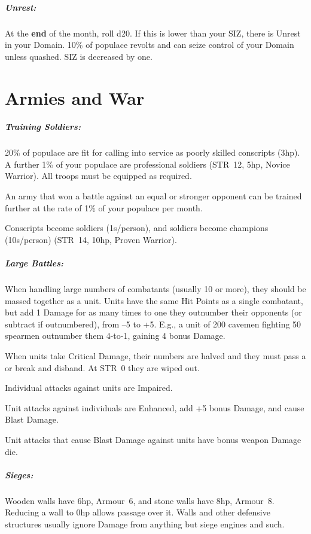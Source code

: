 \documentclass[itdr]{subfiles}
\begin{document}
\subparagraph{Unrest:} At the \textbf{end} of the month, roll d20. If this is lower than your SIZ, there is Unrest in your Domain. 10\% of populace revolts and can seize control of your Domain unless quashed. SIZ is decreased by one.

\section{Armies and War}


\subparagraph{Training Soldiers:} 20\% of populace are fit for calling into service as poorly skilled conscripts (3hp). A further 1\% of your populace are professional soldiers (STR~12, 5hp, Novice Warrior). All troops must be equipped as required.

An army that won a battle against an equal or stronger opponent can be trained further at the rate of 1\% of your populace per month.

Conscripts become soldiers (1s/person), and \mbox{soldiers} become champions (10s/person) (STR~14, 10hp, Proven Warrior).

\subparagraph{Large Battles:} When handling large numbers of combatants (usually 10 or more), they should be massed together as a unit. Units have the same Hit Points as a single combatant, but add 1 Damage for as many times to one they outnumber their opponents (or subtract if outnumbered), from --5 to +5. E.g., a unit of 200 cavemen fighting 50 spearmen outnumber them \mbox{4-to-1}, gaining 4 bonus Damage.

When units take Critical Damage, their numbers are halved and they must pass a  or break and disband. At STR~0 they are wiped out.

Individual attacks against units are Impaired.

Unit attacks against individuals are Enhanced, add +5 bonus Damage, and cause Blast Damage.

Unit attacks that cause Blast Damage against units have bonus weapon Damage die.

\subparagraph{Sieges:} Wooden walls have 6hp, Armour~6, and stone walls have 8hp, Armour~8. Reducing a wall to 0hp allows passage over it. Walls and other defensive structures usually ignore Damage from anything but siege engines and such.
\end{document}
